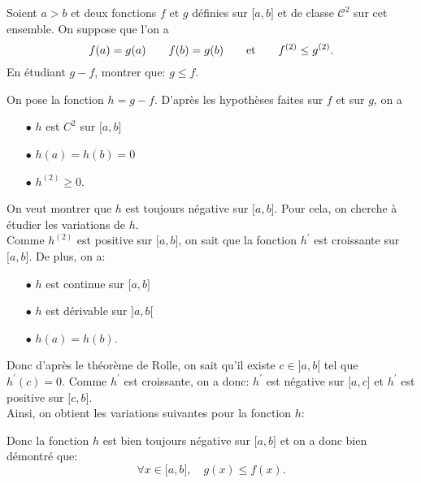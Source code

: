 \documentclass[a4paper, 11pt,reqno]{article}
\begin{document}
\begin{exercice}  \;
	Soient $a>b$ et deux fonctions $f$ et $g$ d\'efinies sur $\lbrack a,b\rbrack$ et de classe $\mathcal{C}^2$ sur cet ensemble. On suppose que l'on a
	$$f(a)=g(a)\qquad f(b)=g(b)\qquad\hbox{et}\qquad f^{(2)}\leq g^{(2)}.$$
	En \'etudiant $g-f$, montrer que: $g\leq f$.
\end{exercice}
\begin{correction}  \;
	\noindent On pose la fonction $h=g-f$. D'apr\`es les hypoth\`eses faites sur $f$ et sur $g$, on a
	\begin{itemize}
		\item[$\bullet$] $h$ est $C^2$ sur $\lbrack a,b\rbrack$
		\item[$\bullet$]  $h(a)=h(b)=0$
		\item[$\bullet$]  $h^{(2)}\geq 0$.
	\end{itemize}
	On veut montrer que $h$ est toujours n\'egative sur $\lbrack a,b\rbrack$. Pour cela, on cherche \`a \'etudier les variations de $h$.\\
	\noindent Comme $h^{(2)}$ est positive sur $\lbrack a,b\rbrack$, on sait que la fonction $h^{\prime}$ est croissante sur $\lbrack a,b\rbrack$. De plus, on a:
	\begin{itemize}
		\item[$\bullet$] $h$ est continue sur $\lbrack a,b\rbrack$
		\item[$\bullet$]  $h$ est d\'erivable sur $\rbrack a,b\lbrack$
		\item[$\bullet$]  $h(a)=h(b)$.
	\end{itemize}
	Donc d'apr\`es le th\'eor\`eme de Rolle, on sait qu'il existe $c\in\rbrack a,b\lbrack$ tel que $h^{\prime}(c)=0$. Comme $h^{\prime}$ est croissante, on a donc: $h^{\prime}$ est n\'egative sur $\lbrack a,c\rbrack$ et $h^{\prime}$ est positive sur $\lbrack c,b\rbrack$.\\
	\noindent Ainsi, on obtient les variations suivantes pour la fonction $h$:
	\begin{center}
	\end{center}
	Donc la fonction $h$ est bien toujours n\'egative sur $\lbrack a,b\rbrack$ et on a donc bien d\'emontr\'e que:
	$$\forall x\in\lbrack a,b\rbrack,\quad g(x) \leq f(x).$$
\end{correction}
\end{document}
